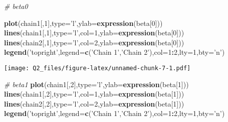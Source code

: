 \documentclass[]{article}
\newenvironment{Shaded}{\begin{snugshade}}{\end{snugshade}}
\newcommand{\KeywordTok}[1]{\textcolor[rgb]{0.13,0.29,0.53}{\textbf{#1}}}
\newcommand{\DataTypeTok}[1]{\textcolor[rgb]{0.13,0.29,0.53}{#1}}
\newcommand{\DecValTok}[1]{\textcolor[rgb]{0.00,0.00,0.81}{#1}}
\newcommand{\StringTok}[1]{\textcolor[rgb]{0.31,0.60,0.02}{#1}}
\newcommand{\CommentTok}[1]{\textcolor[rgb]{0.56,0.35,0.01}{\textit{#1}}}
\newcommand{\OperatorTok}[1]{\textcolor[rgb]{0.81,0.36,0.00}{\textbf{#1}}}
\newcommand{\NormalTok}[1]{#1}
\begin{document}
\begin{Shaded}
\begin{Highlighting}[]
\CommentTok{# beta0}


\KeywordTok{plot}\NormalTok{(chain1[,}\DecValTok{1}\NormalTok{],}\DataTypeTok{type=}\StringTok{'l'}\NormalTok{,}\DataTypeTok{ylab=}\KeywordTok{expression}\NormalTok{(beta[}\DecValTok{0}\NormalTok{]))}
\KeywordTok{lines}\NormalTok{(chain1[,}\DecValTok{1}\NormalTok{],}\DataTypeTok{type=}\StringTok{'l'}\NormalTok{,}\DataTypeTok{col=}\DecValTok{1}\NormalTok{,}\DataTypeTok{ylab=}\KeywordTok{expression}\NormalTok{(beta[}\DecValTok{0}\NormalTok{]))}
\KeywordTok{lines}\NormalTok{(chain2[,}\DecValTok{1}\NormalTok{],}\DataTypeTok{type=}\StringTok{'l'}\NormalTok{,}\DataTypeTok{col=}\DecValTok{2}\NormalTok{,}\DataTypeTok{ylab=}\KeywordTok{expression}\NormalTok{(beta[}\DecValTok{0}\NormalTok{]))}
\KeywordTok{legend}\NormalTok{(}\StringTok{'topright'}\NormalTok{,}\DataTypeTok{legend=}\KeywordTok{c}\NormalTok{(}\StringTok{'Chain 1'}\NormalTok{,}\StringTok{'Chain 2'}\NormalTok{),}\DataTypeTok{col=}\DecValTok{1}\OperatorTok{:}\DecValTok{2}\NormalTok{,}\DataTypeTok{lty=}\DecValTok{1}\NormalTok{,}\DataTypeTok{bty=}\StringTok{'n'}\NormalTok{)}
\end{Highlighting}
\end{Shaded}

\texttt{[image: Q2\_files/figure-latex/unnamed-chunk-7-1.pdf]}

\begin{Shaded}
\begin{Highlighting}[]
\CommentTok{# beta1}
\KeywordTok{plot}\NormalTok{(chain1[,}\DecValTok{2}\NormalTok{],}\DataTypeTok{type=}\StringTok{'l'}\NormalTok{,}\DataTypeTok{ylab=}\KeywordTok{expression}\NormalTok{(beta[}\DecValTok{1}\NormalTok{]))}
\KeywordTok{lines}\NormalTok{(chain1[,}\DecValTok{2}\NormalTok{],}\DataTypeTok{type=}\StringTok{'l'}\NormalTok{,}\DataTypeTok{col=}\DecValTok{1}\NormalTok{,}\DataTypeTok{ylab=}\KeywordTok{expression}\NormalTok{(beta[}\DecValTok{1}\NormalTok{]))}
\KeywordTok{lines}\NormalTok{(chain2[,}\DecValTok{2}\NormalTok{],}\DataTypeTok{type=}\StringTok{'l'}\NormalTok{,}\DataTypeTok{col=}\DecValTok{2}\NormalTok{,}\DataTypeTok{ylab=}\KeywordTok{expression}\NormalTok{(beta[}\DecValTok{1}\NormalTok{]))}
\KeywordTok{legend}\NormalTok{(}\StringTok{'topright'}\NormalTok{,}\DataTypeTok{legend=}\KeywordTok{c}\NormalTok{(}\StringTok{'Chain 1'}\NormalTok{,}\StringTok{'Chain 2'}\NormalTok{),}\DataTypeTok{col=}\DecValTok{1}\OperatorTok{:}\DecValTok{2}\NormalTok{,}\DataTypeTok{lty=}\DecValTok{1}\NormalTok{,}\DataTypeTok{bty=}\StringTok{'n'}\NormalTok{) }
\end{Highlighting}
\end{Shaded}
\end{document}
